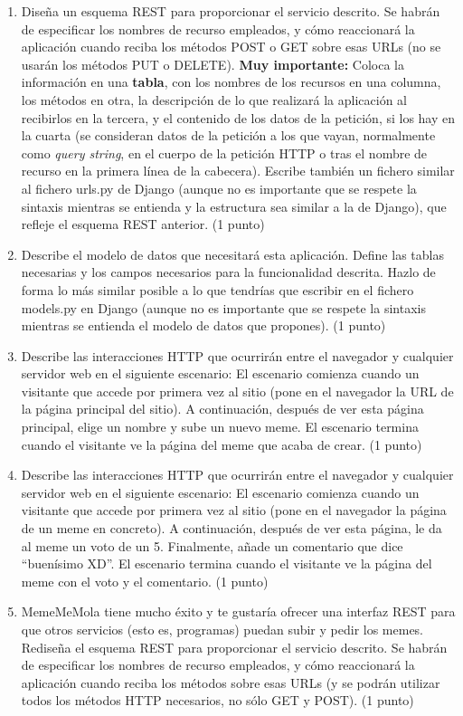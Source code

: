 \begin{enumerate}
  \item Diseña un esquema REST para proporcionar el servicio descrito. Se habrán de especificar los nombres de recurso empleados, y cómo reaccionará la aplicación cuando reciba los métodos POST o GET sobre esas URLs (no se usarán los métodos PUT o DELETE). \textbf{Muy importante:} Coloca la información en una \textbf{tabla}, con los nombres de los recursos en una columna, los métodos en otra, la descripción de lo que realizará la aplicación al recibirlos en la tercera, y el contenido de los datos de la petición, si los hay en la cuarta (se consideran datos de la petición a los que vayan, normalmente como \emph{query string}, en el cuerpo de la petición HTTP o tras el nombre de recurso en la primera línea de la cabecera). Escribe también un fichero similar al fichero urls.py de Django (aunque no es importante que se respete la sintaxis mientras se entienda y la estructura sea similar a la de Django), que refleje el esquema REST anterior. (1 punto)

  \item Describe el modelo de datos que necesitará esta aplicación. Define las tablas necesarias y los campos necesarios para la funcionalidad descrita. Hazlo de forma lo más similar posible a lo que tendrías que escribir en el fichero models.py en Django (aunque no es importante que se respete la sintaxis mientras se entienda el modelo de datos que propones). (1 punto)

  \item Describe las interacciones HTTP que ocurrirán entre el navegador y cualquier servidor web en el siguiente escenario: El escenario comienza cuando un visitante que accede por primera vez al sitio (pone en el navegador la URL de la página principal del sitio). A continuación, después de ver esta página principal, elige un nombre y sube un nuevo meme. El escenario termina cuando el visitante ve la página del meme que acaba de crear. (1 punto)

  \item Describe las interacciones HTTP que ocurrirán entre el navegador y cualquier servidor web en el siguiente escenario: El escenario comienza cuando un visitante que accede por primera vez al sitio (pone en el navegador la página de un meme en concreto). A continuación, después de ver esta página, le da al meme un voto de un 5. Finalmente, añade un comentario que dice ``buenísimo XD''. El escenario termina cuando el visitante ve la página del meme con el voto y el comentario. (1 punto)

  \item MemeMeMola tiene mucho éxito y te gustaría ofrecer una interfaz REST para que otros servicios (esto es, programas) puedan subir y pedir los memes. Rediseña el esquema REST para proporcionar el servicio descrito. Se habrán de especificar los nombres de recurso empleados, y cómo reaccionará la aplicación cuando reciba los métodos sobre esas URLs (y se podrán utilizar todos los métodos HTTP necesarios, no sólo GET y POST). (1 punto)

\end{enumerate}

